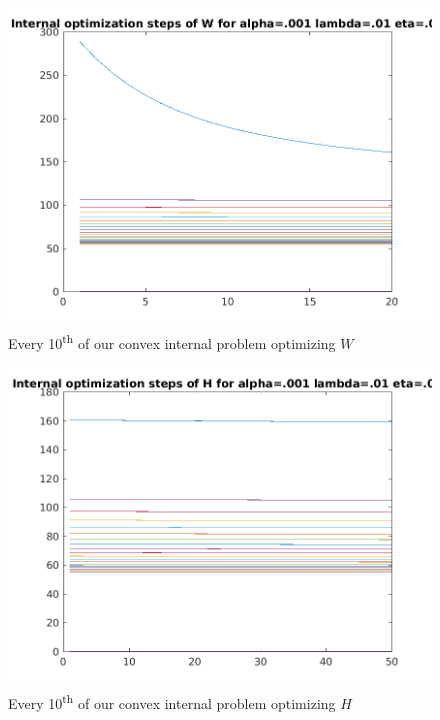 \documentclass{article}
\newcommand{\0}{\mathrm{0}}
\newcommand{\1}{\mathrm{1}}
\begin{document}
\begin{figure}
  \includegraphics{fixed-step-internal-W.png}
  \caption{Every 10\textsuperscript{th} of our convex internal problem optimizing $W$}
\end{figure}

\begin{figure}
  \includegraphics{fixed-step-internal-H.png}
  \caption{Every 10\textsuperscript{th} of our convex internal problem optimizing $H$}
\end{figure}
\end{document}
